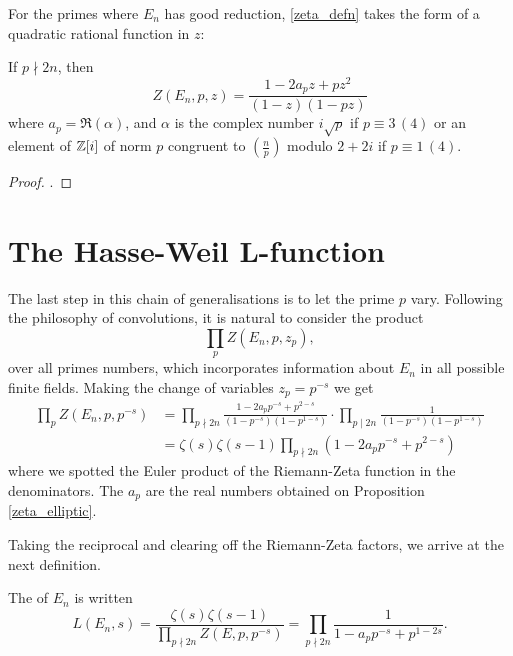 \documentclass[12pt, a4paper]{report}
\begin{document}
For the primes where $E_n$ has good reduction, \autoref{zeta_defn} takes
the form of a quadratic rational function in $z$:

\begin{prop} \label{zeta_elliptic}
  If $p \nmid 2n$, then
  \[Z(E_n, p, z) = \frac{1 - 2a_pz + pz^2}{(1-z)(1-pz)} \]
  where $a_p = \Re(\alpha)$, and $\alpha$ is the complex number
  $i\sqrt{p}$ if $p \equiv 3 \, (4)$ or an element of ${\mathbb Z}[i]$ of
  norm $p$ congruent to $(\frac{n}{p})$ modulo $2+2i$ if $p \equiv 1 \, (4)$. 
\end{prop}

\begin{proof}
  \cite[See][Chater II-2, pages 59-61]{koblitz}.
\end{proof}



\section{The Hasse-Weil L-function}

The last step in this chain of generalisations is to let the prime $p$ vary.
Following the
philosophy of convolutions, it is natural to consider the product
\[\prod\limits_{p} Z(E_n, p, z_p),\]
over all primes numbers,
which incorporates information about $E_n$ in all possible finite fields.
 Making
the change of variables $z_p = p^{-s}$ we get
\[
  \begin{split}
    \prod\limits_{p} Z(E_n, p, p^{-s}) &= \prod\limits_{p \nmid 2n}
    \frac{1-2a_pp^{-s} + p^{2-s}}{(1-p^{-s})(1-p^{1-s})} \cdot \prod\limits_{p \mid
      2n} \frac{1}{(1-p^{-s})(1-p^{1-s})} \\  &=\zeta(s) \zeta(s-1) \prod\limits_{p
      \nmid 2n} (1 - 2a_pp^{-s} + p^{2-s})
  \end{split}
\]
where we spotted the Euler product of the Riemann-Zeta function in the
denominators. The $a_p$ are the real numbers obtained on
Proposition \autoref{zeta_elliptic}.

Taking the reciprocal and clearing off the Riemann-Zeta factors, we arrive at
the next definition.

\begin{defn}
  The  of $E_n$ is written
  \begin{equation} \label{eq:lfunction}
    L(E_n, s) = \frac{\zeta(s) \zeta(s-1)}{\prod_{p \nmid 2n} Z(E, p, p^{-s})}
    = \prod\limits_{p \nmid 2n} \frac{1}{1-a_pp^{-s} + p^{1-2s}}.
  \end{equation}
\end{defn}
\end{document}
